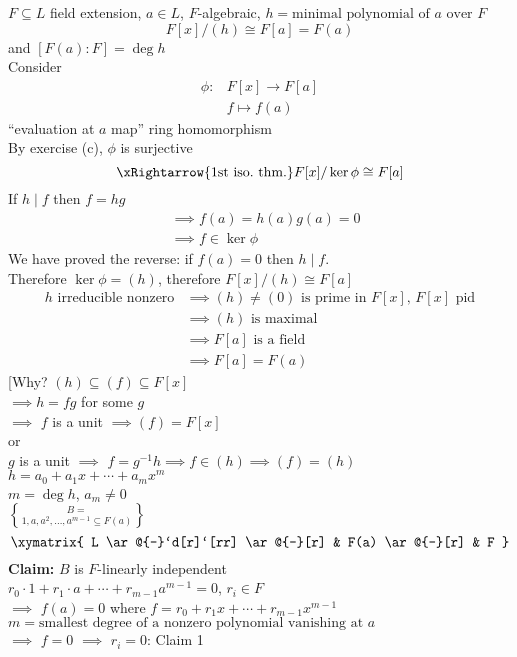 \thm $F\subseteq L$ field extension, $a\in L$, $F$-algebraic, $h=\text{minimal polynomial of $a$ over $F$}$
\[ F[x]/(h) \cong F[a] = F(a) \]
and $[F(a):F]=\deg h$ \\
\pf Consider
\begin{align*}
\phi\colon &F[x] \to F[a] \\
& f \mapsto f(a)
\end{align*}
``evaluation at $a$ map'' ring homomorphism \\
By exercise (c), $\phi$ is surjective \\
\[ \xRightarrow{\text{1st iso.~thm.}} F[x]/\ker\phi \cong F[a] \]
If $h\mid f$ then $f=hg$
\begin{align*}
&\implies f(a) = h(a)g(a) = 0 \\
&\implies f \in \ker\phi
\end{align*}
We have proved the reverse: if $f(a)=0$ then $h\mid f$. \\
Therefore $\ker\phi=(h)$, therefore $F[x]/(h)\cong F[a]$
\begin{align*}
\text{$h$ irreducible nonzero} &\implies \text{$(h)\neq(0)$ is prime in $F[x]$, $F[x]$ pid} \\
&\implies \text{$(h)$ is maximal} \\
&\implies \text{$F[a]$ is a field} \\
&\implies F[a] = F(a)
\end{align*}
[Why?  $(h)\subseteq(f)\subseteq F[x]$ \\
$\implies h=fg$ for some $g$ \\
$\implies$ $f$ is a unit $\implies (f)=F[x]$ \\
\phantom{$\implies$} or \\
\phantom{$\implies$} $g$ is a unit $\implies$ $f=g^{-1}h\implies f\in(h)\implies(f)=(h)$ \\
$h=a_0+a_1x+\dotsb+a_mx^m$ \\
$m=\deg h$, $a_m\neq0$ \\
$B=\brace{1,a,a^2,\dotsc,a^{m-1}}\subseteq F(a)$
\[ \xymatrix{
L \ar@{-}`d[r]`[rr] \ar@{-}[r] & F(a) \ar@{-}[r] & F
} \]
\textbf{Claim:} $B$ is $F$-linearly independent \\
\pf $r_0\cdot1+r_1\cdot a+\dotsb+r_{m-1}a^{m-1}=0$, $r_i\in F$ \\
$\implies$ $f(a)=0$ where $f=r_0+r_1x+\dotsb+r_{m-1}x^{m-1}$ \\
$m=\text{smallest degree of a nonzero polynomial vanishing at $a$}$ \\
$\implies$ $f=0$ $\implies$ $r_i=0$: Claim 1

